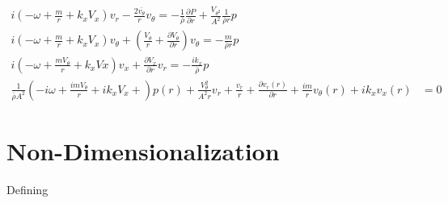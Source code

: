 



 \begin{align*}
 i\left(
     -\omega + \frac{ m}{r} +  k_x V_x 
 \right) v_r - 
 \frac{2 \bar{v_{\theta}}}{r}v_{\theta}  
 = -\frac{1}{\bar{\rho}} \frac{\partial P}{\partial r}+
 \frac{V_{\theta^2}}{A^2}\frac{1}{\bar{\rho} r}p\\
i\left(-\omega + \frac{ m}{r} +  k_x V_x \right) v_{\theta} + \left(\frac{V_{\theta}}{r} +  \frac{\partial V_{\theta}}{\partial r}\right)v_\theta = -\frac{m}{\bar{\rho}r}p \\ 
 i\left(-\omega + \frac{mV_{\theta}}{r} +  k_xVx\right)v_x + \frac{\partial V_x}{\partial r} v_r = - \frac{i
 	k_x}{\bar{\rho}}p\\ 
 \frac{1}{\bar{\rho} A^2} \left(-i\omega + \frac{imV_{\theta}}{r} + ik_xV_x  +
 \right)p(r)  +
 \frac{V_{\theta}^2}{A^2 r}v_r+ \frac{v_r}{r} +
 \frac{\partial v_r(r)}{\partial r}+ 
 \frac{im}{r} v_{\theta}(r)
 +
 ik_xv_x(r) 
 &= 0
 \end{align*}


 \section{Non-Dimensionalization}
 Defining 

